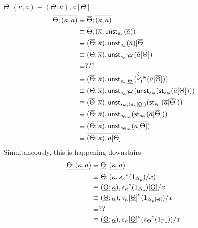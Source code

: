 \documentclass[10pt]{article}
\theoremstyle{definition}
\newcommand{\rewrite}[2]{\overleftarrow{#1}(#2)}
\newcommand\StI[2]{\ensuremath{\mathsf{st}_{#1}(#2)}}
\newcommand\UnSt[2]{\ensuremath{\mathsf{unst}_{#1}(#2)}}
\newcommand\TrCirc[2]{\ensuremath{{#1}^\circ(#2)}}
\begin{document}
\begin{enumerate}[style = multiline, labelwidth = 80pt]
\item[{$\Theta ; (\kappa , a) \equiv (\Theta ; \kappa) , a[\Theta]$}] 
\begin{align*}
\upstairs{\Theta ; (\kappa , a) }
&\equiv \upstairs{\Theta} ; \upstairs{(\kappa , a)} \\
&\equiv \upstairs{\Theta} ; (\upstairs{\kappa}, \UnSt{s_{\kappa}}{\upstairs{a}}) \\
&\equiv (\upstairs{\Theta} ; \upstairs{\kappa}) , \UnSt{s_{\kappa}}{\upstairs{a}}[\upstairs{\Theta}] \\
&\equiv (\upstairs{\Theta} ; \upstairs{\kappa}) , \UnSt{s_{\kappa}[\downstairs{\Theta}]}{\upstairs{a}[\upstairs{\Theta}]} \\
&\equiv ??? \\
&\equiv (\upstairs{\Theta} ; \upstairs{\kappa}) , \UnSt{s_{\kappa}[\downstairs{\Theta}]}{\rewrite{\varepsilon^{s_\Theta}_{1}}{\upstairs{a}[\upstairs{\Theta}]}} \\
&\equiv (\upstairs{\Theta} ; \upstairs{\kappa}) , \UnSt{s_{\kappa}[\downstairs{\Theta}]}{\UnSt{s_\Theta}{\StI{s_{\Theta}}{\upstairs{a}[\upstairs{\Theta}]}}} \\
&\equiv (\upstairs{\Theta} ; \upstairs{\kappa}) , \UnSt{s_\Theta ; (s_{\kappa}[\downstairs{\Theta}])}{\StI{s_{\Theta}}{\upstairs{a}[\upstairs{\Theta}]}} \\
&\equiv (\upstairs{\Theta} ; \upstairs{\kappa}) , \UnSt{s_{\Theta;\kappa}}{\StI{s_{\Theta}}{\upstairs{a}[\upstairs{\Theta}]}} \\
&\equiv \upstairs{(\Theta ; \kappa)} , \UnSt{s_{\Theta;\kappa}}{\upstairs{a[\Theta]}} \\
&\equiv \upstairs{(\Theta ; \kappa) , a[\Theta]} 
\end{align*}
Simultaneously, this is happening downstairs:
\begin{align*}
\downstairs{\Theta ; (\kappa , a) }
&\equiv \downstairs{\Theta} ; \downstairs{(\kappa , a)} \\
&\equiv \downstairs{\Theta} ; (\downstairs{\kappa} , \TrCirc{s_{\kappa}}{1_{\asdep{\Delta}}}/x) \\
&\equiv (\downstairs{\Theta} ; \downstairs{\kappa}) , \TrCirc{s_{\kappa}}{1_{\asdep{\Delta}}}[\downstairs{\Theta}]/x \\
&\equiv (\downstairs{\Theta} ; \downstairs{\kappa}) , \TrCirc{s_{\kappa}[\downstairs{\Theta}]}{1_{\asdep{\Delta}[\downstairs{\Theta}]}}/x \\
&\equiv ?? \\
&\equiv (\downstairs{\Theta}; \downstairs{\kappa}) , \TrCirc{s_{\kappa}[\downstairs{\Theta}]}{\TrCirc{s_{\Theta}}{1_{\asdep{\Gamma}}}} / x \\

\end{align*}
\end{enumerate}
\end{document}
